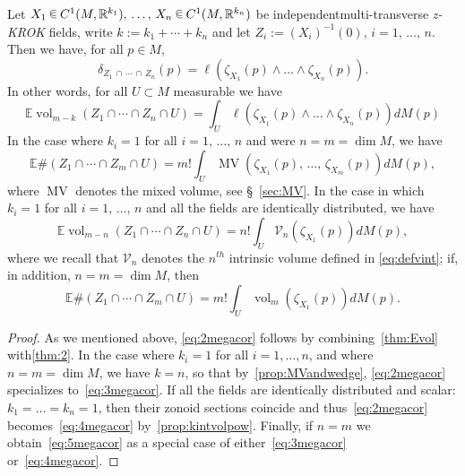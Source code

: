 \documentclass[10pt]{amsart}
\theoremstyle{definition}\newtheorem{defi}[theo]{Definition}\newtheorem{rema}[theo]{Remark}\newtheorem{exam}[theo]{Example}\newtheorem{exem}[theo]{Example}\newtheorem{nota}[theo]{Notation}
\newcommand{\R}{\mathbb{R}}
\newcommand{\EE}{\mathbb{E}}
\DeclareMathOperator{\vol}{vol}
\DeclareMathOperator{\MV}{MV}
\newcommand{\Vint}{\mathcal{V}}
\newcommand{\zkrok}{\emph{z-KROK}\xspace}
\newcommand*\randin{
\mathchoice {\raisebox{-.35ex}{$\displaystyle{^\subset}$}\mkern-11.5mu\raisebox{+.45ex}{$\displaystyle{_\subset}$}} {\mkern+1mu\raisebox{-.27ex}{$\textstyle{^\subset}$}\mkern-11.7mu\raisebox{+.45ex}{$\textstyle{_\subset}$}} {\raisebox{.35ex}{$\scriptstyle\subset$}\mkern-14mu\raisebox{-.15ex}{$\scriptstyle\subset$}} {\raisebox{.3ex}{$\scriptscriptstyle\subset$}\mkern-13.5mu\raisebox{-.10ex}{$\scriptscriptstyle\subset$}}}
\begin{document}
\begin{coro}\label{cor:Evolvol}
Let $X_1\,\randin\, C^1(M,\R^{k_1}),\,\ldots,\,X_n\,\randin\, C^1(M,\R^{k_n})$ be independent\linebreak multi-transverse \zkrok fields, write $k:=k_1+\cdots+k_n$ and let $Z_i:=(X_i)^{-1}(0)$, $i=1,\,\ldots,\,n$. Then we have, for all $p\in M$,
\begin{equation}\label{eq:1megacor}
\delta_{Z_1\,\cap\,\cdots\,\cap\,Z_n}(p)=\ell(\zeta_{X_1}(p)\wedge\ldots\wedge \zeta_{X_n}(p)).
\end{equation}
In other words, for all $U\subset M$ measurable we have
\begin{equation}\label{eq:2megacor}
\EE\vol_{m-k}\left(Z_1\cap\cdots\cap Z_n\cap U\right)=\int_U \ell(\zeta_{X_1}(p)\wedge\ldots \wedge\zeta_{X_n}(p)) dM (p)
\end{equation} In the case where $k_i=1$ for all $i=1,\,\dots,\,n$ and were $n=m=\dim M$, we have
\begin{equation}\label{eq:3megacor}
\EE\#\left(Z_1\cap\cdots\cap Z_m\cap U\right)=m!\int_U \MV(\zeta_{X_1}(p),\,\ldots,\,\zeta_{X_m}(p)) dM (p),
\end{equation}
where $\MV$ denotes the mixed volume, see \S~\ref{sec:MV}. In the case in which $k_i=1$ for all $i=1,\,\dots,\,n$ and all the fields are identically distributed, we have
\begin{equation}\label{eq:4megacor}
\EE\vol_{m-n}\left(Z_1\cap\cdots\cap Z_n\cap U\right)=n!\int_U \Vint_n(\zeta_{X_1}(p)) dM (p),
\end{equation}
where we recall that $\Vint_n$ denotes the $n^{th}$ intrinsic volume defined in \eqref{eq:defvint}; if, in addition, $n=m=\dim M$, then
\begin{equation}\label{eq:5megacor}
\EE\#\left(Z_1\cap\cdots\cap Z_m\cap U\right)=m!\int_U \vol_m(\zeta_{X_1}(p)) dM (p).
\end{equation}
\end{coro}

\begin{proof}
As we mentioned above, \eqref{eq:2megacor} follows by combining~\cref{thm:Evol} with\linebreak \cref{thm:2}. In the case where $k_i=1$ for all $i=1,\ldots,n$, and where $n=m=\dim M$, we have $k=n$, so that by~\cref{prop:MVandwedge}, \eqref{eq:2megacor} specializes to~\eqref{eq:3megacor}. If all the fields are identically distributed and scalar: $k_1=\dots=k_n=1$, then their zonoid sections coincide and thus~\eqref{eq:2megacor} becomes~\eqref{eq:4megacor} by~\cref{prop:kintvolpow}. Finally, if $n=m$ we obtain~\eqref{eq:5megacor} as a special case of either~\eqref{eq:3megacor} or~\eqref{eq:4megacor}.
\end{proof}
\end{document}
